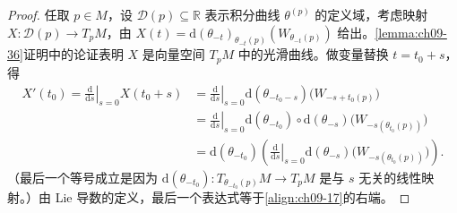 \documentclass[../../main.tex]{subfiles}
\begin{document}
\begin{proof}
任取 $p\in M$，设 $\mathscr{D}(p)\subseteq\mathbb{R}$ 表示积分曲线 $\theta^{(p)}$ 的定义域，考虑映射 $X\colon\mathscr{D}(p)\to T_pM$，由 $X(t)=\mathrm{d}(\theta_{-t})_{\theta_{-t}(p)}(W_{\theta_{-t}(p)})$ 给出。\cref{lemma:ch09-36}证明中的论证表明 $X$ 是向量空间 $T_pM$ 中的光滑曲线。做变量替换 $t=t_0+s$，得
\begin{align*}
X'(t_0)=\left.\frac{\mathrm{d}}{\mathrm{d}s}\right|_{s=0}X(t_0+s)
&=\left.\frac{\mathrm{d}}{\mathrm{d}s}\right|_{s=0}\mathrm{d}(\theta_{-t_0-s})\bigl(W_{-s+t_0(p)}\bigr)\\
&=\left.\frac{\mathrm{d}}{\mathrm{d}s}\right|_{s=0}\mathrm{d}(\theta_{-t_0})\circ\mathrm{d}(\theta_{-s})\bigl(W_{-s(\theta_{t_0}(p))}\bigr)\\
&=\mathrm{d}(\theta_{-t_0})\left(\left.\frac{\mathrm{d}}{\mathrm{d}s}\right|_{s=0}\mathrm{d}(\theta_{-s})\bigl(W_{-s(\theta_{t_0}(p))}\bigr)\right).
\end{align*}
（最后一个等号成立是因为 $\mathrm{d}(\theta_{-t_0})\colon T_{\theta_{-t_0}(p)}M\to T_pM$ 是与 $s$ 无关的线性映射。）由 Lie 导数的定义，最后一个表达式等于\eqref{align:ch09-17}的右端。
\end{proof}
\end{document}

